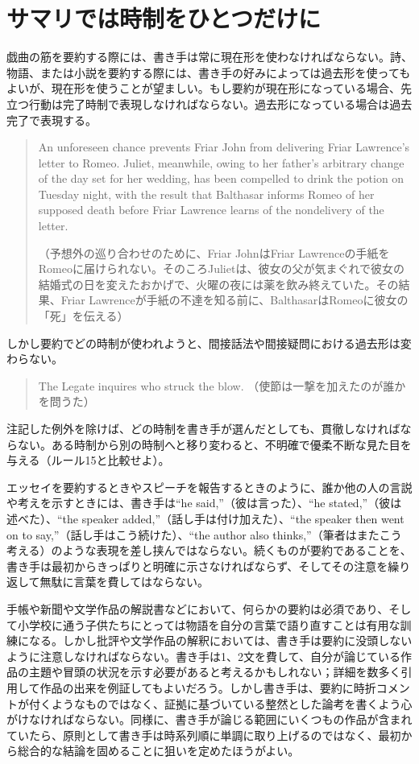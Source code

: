 \section{サマリでは時制をひとつだけに}
戯曲の筋を要約する際には、書き手は常に現在形を使わなければならない。詩、物語、または小説を要約する際には、書き手の好みによっては過去形を使ってもよいが、現在形を使うことが望ましい。もし要約が現在形になっている場合、先立つ行動は完了時制で表現しなければならない。過去形になっている場合は過去完了で表現する。
\begin{quote}
    An unforeseen chance prevents Friar John from delivering Friar
Lawrence's letter to Romeo. Juliet, meanwhile, owing to her father's
arbitrary change of the day set for her wedding, has been compelled to
drink the potion on Tuesday night, with the result that Balthasar
informs Romeo of her supposed death before Friar Lawrence learns of the
nondelivery of the letter.

（予想外の巡り合わせのために、Friar
JohnはFriar
Lawrenceの手紙をRomeoに届けられない。そのころJulietは、彼女の父が気まぐれで彼女の結婚式の日を変えたおかげで、火曜の夜には薬を飲み終えていた。その結果、Friar
Lawrenceが手紙の不達を知る前に、BalthasarはRomeoに彼女の「死」を伝える）
\end{quote}
しかし要約でどの時制が使われようと、間接話法や間接疑問における過去形は変わらない。
\begin{quote}
    The Legate inquires who struck the blow.
    （使節は一撃を加えたのが誰かを問うた）
\end{quote}
注記した例外を除けば、どの時制を書き手が選んだとしても、貫徹しなければならない。ある時制から別の時制へと移り変わると、不明確で優柔不断な見た目を与える（ルール15と比較せよ）。
\par
エッセイを要約するときやスピーチを報告するときのように、誰か他の人の言説や考えを示すときには、書き手は``he
said,''（彼は言った）、``he stated,''（彼は述べた）、``the speaker
added,''（話し手は付け加えた）、``the speaker then went on to
say,''（話し手はこう続けた）、``the author also
thinks,''（筆者はまたこう考える）のような表現を差し挟んではならない。続くものが要約であることを、書き手は最初からきっぱりと明確に示さなければならず、そしてその注意を繰り返して無駄に言葉を費してはならない。
\par
手帳や新聞や文学作品の解説書などにおいて、何らかの要約は必須であり、そして小学校に通う子供たちにとっては物語を自分の言葉で語り直すことは有用な訓練になる。しかし批評や文学作品の解釈においては、書き手は要約に没頭しないように注意しなければならない。書き手は1、2文を費して、自分が論じている作品の主題や冒頭の状況を示す必要があると考えるかもしれない；詳細を数多く引用して作品の出来を例証してもよいだろう。しかし書き手は、要約に時折コメントが付くようなものではなく、証拠に基づいている整然とした論考を書くよう心がけなければならない。同様に、書き手が論じる範囲にいくつもの作品が含まれていたら、原則として書き手は時系列順に単調に取り上げるのではなく、最初から総合的な結論を固めることに狙いを定めたほうがよい。
